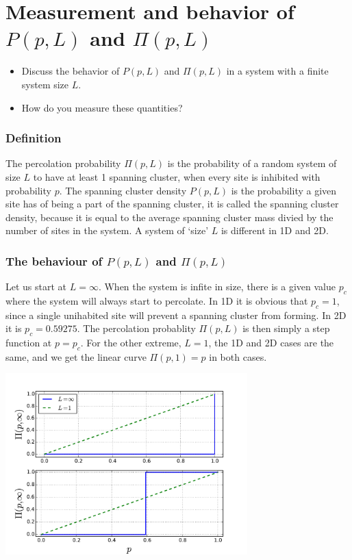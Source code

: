 \documentclass[a4paper, 11pt, notitlepage, english]{article}
\begin{document}
\clearpage



\section{Measurement and behavior of $P(p, L)$ and $\Pi(p, L)$}
\begin{itemize}
\item Discuss the behavior of $P(p, L)$ and $\Pi(p, L)$ in a system with a finite system
size $L$.
\item How do you measure these quantities?
\end{itemize}

\subsubsection*{Definition}

The percolation probability $\Pi(p, L)$ is the probability of a random system of size $L$ to have at least 1 spanning cluster, when every site is inhibited with probability $p$. The spanning cluster density $P(p,L)$ is the probability a given site has of being a part of the spanning cluster, it is called the spanning cluster density, because it is equal to the average spanning cluster mass divied by the number of sites in the system. A system of `size' $L$ is different in 1D and 2D.

\subsubsection*{The behaviour of $P(p, L)$ and $\Pi(p, L)$}

Let us start at $L=\infty$. When the system is infite in size, there is a given value $p_c$ where the system will always start to percolate. In 1D it is obvious that $p_c = 1$, since a single unihabited site will prevent a spanning cluster from forming. In 2D it is $p_c = 0.59275$. The percolation probablity $\Pi(p,L)$ is then simply a step function at $p=p_c$.  For the other extreme, $L=1$, the 1D and 2D cases are the same, and we get the linear curve $\Pi(p, 1) = p$ in both cases. 
\begin{center}
	\includegraphics[width=0.7\textwidth]{15.pdf}
\end{center}
\end{document}

